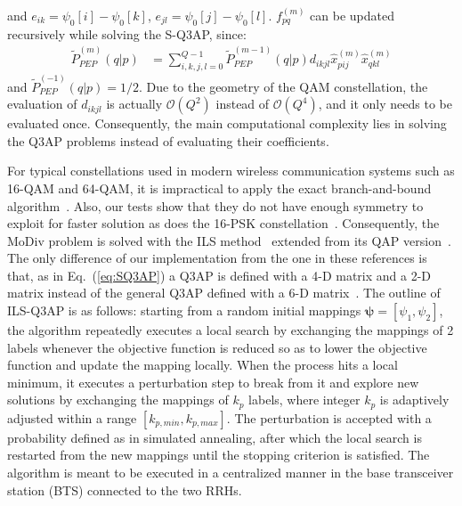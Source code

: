 \documentclass[journal]{IEEEtran}
\begin{document}
and $e_{ik} = \psi_0[i] - \psi_0[k]$, $e_{jl} = \psi_0[j] - \psi_0[l]$.
$f_{pq}^{(m)}$ can be updated recursively while solving the S-Q3AP, since:
\begin{align}
  \tilde{P}_{PEP}^{(m)}(q|p) & =
  \sum_{i,k,j,l=0}^{Q-1}\tilde{P}_{PEP}^{(m-1)}(q|p)d_{ikjl}
  \hat{x}_{pij}^{(m)}\hat{x}_{qkl}^{(m)}
  \label{eq:pep_update}
\end{align}
and $ \tilde{P}_{PEP}^{(-1)}(q|p) = 1/2$. Due to the geometry
of the QAM constellation, the evaluation of $d_{ikjl}$ is actually $\mathcal{O}(Q^2)$ instead of $\mathcal{O}(Q^4)$, and
it only needs to be evaluated once. Consequently, the main computational
complexity lies in solving the Q3AP problems instead of evaluating their
coefficients.

For typical constellations used in modern wireless communication systems such as
16-QAM and 64-QAM, it is impractical to apply the exact branch-and-bound
algorithm~\cite{hahn2008quadratic}. Also, our tests show that they do not have
enough symmetry to exploit for faster solution as does the 16-PSK
constellation~\cite{mittelmann2015solving}.
Consequently, the MoDiv problem is solved with the ILS
method~\cite[Sec. 5.5]{hahn2008quadratic} extended from its QAP
version~\cite{stutzle2006iterated}. The only difference of our
implementation from the one in these references is that, as in
Eq.~(\ref{eq:SQ3AP}) a Q3AP is defined with a 4-D matrix and a 2-D matrix
instead of the general Q3AP defined with a 6-D
matrix~\cite[Eq.(2)]{hahn2008quadratic}. The outline of ILS-Q3AP is as
follows: starting from a random initial mappings $\bm{\psi}=[\psi_1,
\psi_2]$, the algorithm repeatedly executes a local search by exchanging the
mappings of 2 labels whenever the objective function is reduced so as to lower
the objective function and update the mapping locally. When the process hits a
local minimum, it executes a perturbation step to break from it and explore new
solutions by exchanging the mappings of $k_p$ labels, where integer $k_p$ is
adaptively adjusted within a range $[k_{p,min}, k_{p,max}]$. The perturbation is
accepted with a probability defined as in simulated annealing, after which the
local search is restarted from the new mappings until the stopping criterion is
satisfied. The algorithm is meant to be executed in a centralized manner in the
base transceiver station (BTS) connected to the two RRHs.
\end{document}
